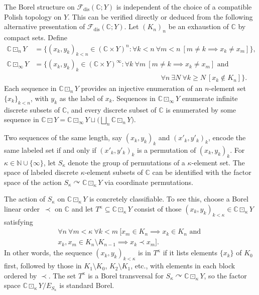 \documentclass[12pt]{paper}
\numberwithin{equation}{section}
\theoremstyle{plain}
\theoremstyle{definition}
\newcommand{\C}{\mathbb{C}}
\newcommand{\N}{\mathbb{N}}
\newcommand{\effrosdis}[1]{\mathcal{F}_{\textrm{dis}}(#1)}
\DeclareMathOperator{\lprod}{\boxdot}
\newcommand{\acts}{\curvearrowright}
\begin{document}
The Borel structure on \(\effrosdis{\C; Y}\) is independent of the choice of a compatible Polish
topology on \(Y\).  This can be verified directly or deduced from the following alternative
presentation of \(\effrosdis{\C;Y}\).  Let \((K_{n})_{n}\) be an exhaustion of \(\C\) by compact
sets.  Define
\begin{displaymath}
  \begin{aligned}
    \C \lprod_{n} Y
    &= \{(x_{k}, y_{k})_{k < n} \in (\C \times Y)^{n} : \forall k < n\ \forall m <n\
      [ m \ne k \implies x_{k} \ne x_{m}]\},\\
    \C \lprod_{\infty} Y
    &= \bigl\{(x_{k},y_{k})_{k} \in (\C \times Y)^{\infty} : \forall k\  \forall m\
      [ m \ne k \implies x_{k} \ne x_{m}] \textrm{ and } \\
    &\qquad \qquad \qquad \qquad \qquad \qquad \qquad \qquad \qquad
      \forall n\ \exists N\ \forall k \ge N\ [x_{k} \not \in K_{n}] \bigr\}.
  \end{aligned}
\end{displaymath}
Each sequence in \( \C \lprod_{n} Y\) provides an injective enumeration of an \(n\)-element set
\(\{x_{k}\}_{k<n}\), with \(y_{k}\) as the label of \(x_{k}\).  Sequences in
\( \C \lprod_{\infty} Y\) enumerate infinite discrete subsets of \(\C\), and every discrete subset
of \(\C\) is enumerated by some sequence in
\( \C \lprod Y = \C \lprod_{\infty} Y \sqcup \bigl( \bigsqcup_{n} \C \lprod_{n} Y \bigr)\).

Two sequences of the same length, say \((x_{k},y_{k})_{k}\) and \((x'_{k}, y'_{k})_{k}\), encode the
same labeled set if and only if \((x'_{k},y'_{k})_{k}\) is a permutation of \((x_{k},y_{k})_{k}\).
For \(\kappa \in \N \cup \{\infty\}\), let \(S_{\kappa}\) denote the group of permutations of a
\(\kappa\)-element set.  The space of labeled discrete \(\kappa\)-element subsets of \(\C\) can be
identified with the factor space of the action \(S_{\kappa} \acts \C \lprod_{\kappa} Y\) via
coordinate permutations.

The action of \(S_{\kappa}\) on \(\C \lprod_{\kappa} Y\) is concretely classifiable.  To see this,
choose a Borel linear order~\(\prec\) on \(\C\) and let
\(T^{\kappa} \subseteq \C \lprod_{\kappa} Y \) consist of those
\((x_{k},y_{k})_{k<\kappa} \in \C \lprod_{\kappa} Y\) satisfying
\begin{multline*}
  \forall n\ \forall m < \kappa\ \forall k < m\ \bigl[ x_{m} \in K_{n} \implies x_{k} \in K_{n}
  \textrm{ and } \\ x_{k},x_{m} \in K_{n}\setminus K_{n-1} \implies x_{k} \prec x_{m}\bigr].
\end{multline*}
In other words, the sequence \((x_{k},y_{k})_{k < \kappa}\) is in \(T^{\kappa}\) if it lists
elements \(\{x_{k}\}\) of \(K_{0}\) first, followed by those in \(K_{1}\setminus K_{0}\),
\(K_{2}\setminus K_{1}\), etc., with elements in each block ordered by \(\prec\).  The set
\(T^{\kappa}\) is a Borel transversal for \(S_{\kappa} \acts \C \lprod_{\kappa} Y\), so the factor
space \(\C \lprod_{\kappa} Y / E_{S_{\kappa}}\) is standard Borel.
\end{document}
